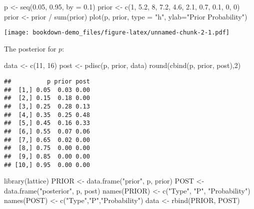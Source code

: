 \documentclass[
]{book}
\newenvironment{Shaded}{\begin{snugshade}}{\end{snugshade}}
\newcommand{\AttributeTok}[1]{\textcolor[rgb]{0.77,0.63,0.00}{#1}}
\newcommand{\DecValTok}[1]{\textcolor[rgb]{0.00,0.00,0.81}{#1}}
\newcommand{\FloatTok}[1]{\textcolor[rgb]{0.00,0.00,0.81}{#1}}
\newcommand{\FunctionTok}[1]{\textcolor[rgb]{0.00,0.00,0.00}{#1}}
\newcommand{\NormalTok}[1]{#1}
\newcommand{\OtherTok}[1]{\textcolor[rgb]{0.56,0.35,0.01}{#1}}
\newcommand{\SpecialCharTok}[1]{\textcolor[rgb]{0.00,0.00,0.00}{#1}}
\newcommand{\StringTok}[1]{\textcolor[rgb]{0.31,0.60,0.02}{#1}}
\begin{document}
\begin{Shaded}
\begin{Highlighting}[]
\NormalTok{p }\OtherTok{\textless{}{-}} \FunctionTok{seq}\NormalTok{(}\FloatTok{0.05}\NormalTok{, }\FloatTok{0.95}\NormalTok{, }\AttributeTok{by =} \FloatTok{0.1}\NormalTok{)}
\NormalTok{prior }\OtherTok{\textless{}{-}} \FunctionTok{c}\NormalTok{(}\DecValTok{1}\NormalTok{, }\FloatTok{5.2}\NormalTok{, }\DecValTok{8}\NormalTok{, }\FloatTok{7.2}\NormalTok{, }\FloatTok{4.6}\NormalTok{, }\FloatTok{2.1}\NormalTok{, }
           \FloatTok{0.7}\NormalTok{, }\FloatTok{0.1}\NormalTok{, }\DecValTok{0}\NormalTok{, }\DecValTok{0}\NormalTok{)}
\NormalTok{prior }\OtherTok{\textless{}{-}}\NormalTok{ prior }\SpecialCharTok{/} \FunctionTok{sum}\NormalTok{(prior)}
\FunctionTok{plot}\NormalTok{(p, prior, }\AttributeTok{type =} \StringTok{"h"}\NormalTok{, }
     \AttributeTok{ylab=}\StringTok{"Prior Probability"}\NormalTok{)}
\end{Highlighting}
\end{Shaded}

\texttt{[image: bookdown-demo\_files/figure-latex/unnamed-chunk-2-1.pdf]}

The posterior for \(p\):

\begin{Shaded}
\begin{Highlighting}[]
\NormalTok{data }\OtherTok{\textless{}{-}} \FunctionTok{c}\NormalTok{(}\DecValTok{11}\NormalTok{, }\DecValTok{16}\NormalTok{)}
\NormalTok{post }\OtherTok{\textless{}{-}} \FunctionTok{pdisc}\NormalTok{(p, prior, data)}
\FunctionTok{round}\NormalTok{(}\FunctionTok{cbind}\NormalTok{(p, prior, post),}\DecValTok{2}\NormalTok{)}
\end{Highlighting}
\end{Shaded}

\begin{verbatim}
##          p prior post
##  [1,] 0.05  0.03 0.00
##  [2,] 0.15  0.18 0.00
##  [3,] 0.25  0.28 0.13
##  [4,] 0.35  0.25 0.48
##  [5,] 0.45  0.16 0.33
##  [6,] 0.55  0.07 0.06
##  [7,] 0.65  0.02 0.00
##  [8,] 0.75  0.00 0.00
##  [9,] 0.85  0.00 0.00
## [10,] 0.95  0.00 0.00
\end{verbatim}

\begin{Shaded}
\begin{Highlighting}[]
\FunctionTok{library}\NormalTok{(lattice)}
\NormalTok{PRIOR }\OtherTok{\textless{}{-}} \FunctionTok{data.frame}\NormalTok{(}\StringTok{"prior"}\NormalTok{, p, prior)}
\NormalTok{POST }\OtherTok{\textless{}{-}} \FunctionTok{data.frame}\NormalTok{(}\StringTok{"posterior"}\NormalTok{, p, post)}
\FunctionTok{names}\NormalTok{(PRIOR) }\OtherTok{\textless{}{-}} \FunctionTok{c}\NormalTok{(}\StringTok{"Type"}\NormalTok{, }\StringTok{"P"}\NormalTok{, }\StringTok{"Probability"}\NormalTok{)}
\FunctionTok{names}\NormalTok{(POST) }\OtherTok{\textless{}{-}} \FunctionTok{c}\NormalTok{(}\StringTok{"Type"}\NormalTok{,}\StringTok{"P"}\NormalTok{,}\StringTok{"Probability"}\NormalTok{)}
\NormalTok{data }\OtherTok{\textless{}{-}} \FunctionTok{rbind}\NormalTok{(PRIOR, POST)}
\end{Highlighting}
\end{Shaded}
\end{document}
